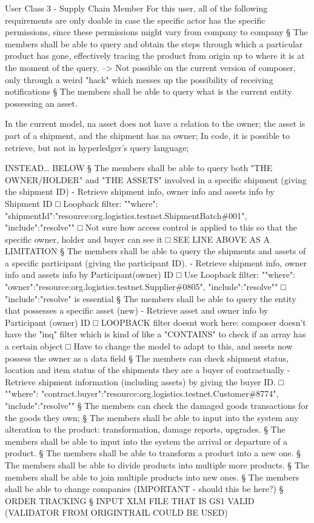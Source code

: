{		\par User Class 3 - Supply Chain Member
		For this user, all of the following requirements are only doable in case the specific actor has the specific permissions, since these permissions might vary from company to company
			§ The members shall be able to query and obtain the steps through which a particular product has gone, effectively tracing the product from origin up to where it is at the moment of the query. --> Not possible on the current version of composer, only through a weird "hack" which messes up the possibility of receiving notifications
			§ The members shall be able to query what is the current entity possessing an asset.
				\par In the current model, na asset does not have a relation to the owner; the asset is part of a shipment, and the shipment has na owner; In code, it is possible to retrieve, but not in hyperledger's query language;
				\par INSTEAD… BELOW
			§ The members shall be able to query both "THE OWNER/HOLDER" and "THE ASSETS" involved in a specific shipment (giving the shipment ID) - Retrieve shipment info, owner info and assets info by Shipment ID
				□ Loopback filter: "{"where": {"shipmentId":"resource:org.logistics.testnet.ShipmentBatch\#001"}, "include":"resolve"}" 
				□ Not sure how access control is applied to this so that the specific owner, holder and buyer can see it
				□ SEE LINE ABOVE AS A LIMITATION 
			§ The members shall be able to query the shipments and assets of a specific participant (giving the participant ID). - Retrieve shipment info, owner info and assets info by Participant(owner) ID
				□ Use Loopback filter: "{"where": {"owner":"resource:org.logistics.testnet.Supplier\#0805"}, "include":"resolve"}"  
				□ "include":"resolve" is essential
			§ The members shall be able to query the entity that possesses a specific asset (new) - Retrieve asset and owner info by Participant (owner) ID
				□ LOOPBACK filter doesnt work here: composer doesn't have the "inq" filter which is kind of like a "CONTAINS" to check if an array has a certain object
				□ Have to change the model to adapt to this, and assets now possess the owner as a data field
			§ The members can check shipment status, location and item status of the shipments they are a buyer of contractually - Retrieve shipment information (including assets) by giving the buyer ID.
				□ "{"where": {"contract.buyer":"resource:org.logistics.testnet.Customer\#8774"}, "include":"resolve"}"  
			§ The members can check the damaged goods transactions for the goods they own;
			§ The members shall be able to input into the system any alteration to the product: transformation, damage reports, upgrades.
			§ The members shall be able to input into the system the arrival or departure of a product.
			§ The members shall be able to transform a product into a new one.
			§ The members shall be able to divide products into multiple more products.
			§ The members shall be able to join multiple products into new ones.
			§ The members shall be able to change companies (IMPORTANT - should this be here?)
			§ ORDER TRACKING
			§ INPUT XLM FILE THAT IS GS1 VALID (VALIDATOR FROM ORIGINTRAIL COULD BE USED)


}
